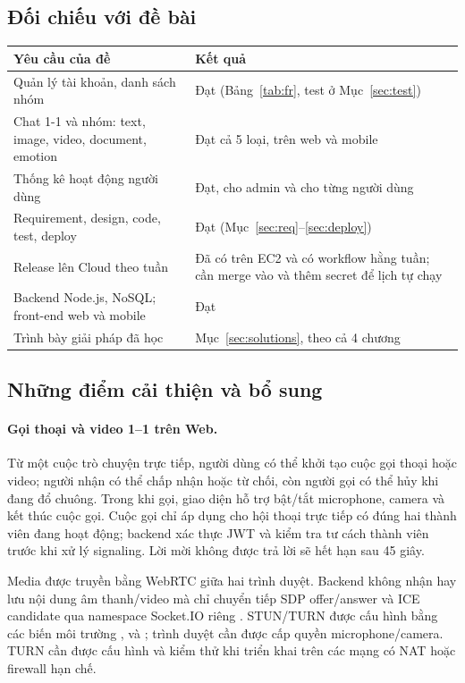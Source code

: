 \documentclass[11pt, a4paper]{article}
\begin{document}
\subsection{Đối chiếu với đề bài}
\begin{table}[H]
  \centering
  \small
  \begin{tabularx}{\linewidth}{P{6cm}Y}
    \toprule
    \textbf{Yêu cầu của đề} & \textbf{Kết quả} \\
    \midrule
    Quản lý tài khoản, danh sách nhóm & Đạt (Bảng~\ref{tab:fr}, test ở Mục~\ref{sec:test}) \\
    Chat 1-1 và nhóm: text, image, video, document, emotion & Đạt cả 5 loại, trên web và mobile \\
    Thống kê hoạt động người dùng & Đạt, cho admin và cho từng người dùng \\
    Requirement, design, code, test, deploy & Đạt (Mục~\ref{sec:req}--\ref{sec:deploy}) \\
    Release lên Cloud theo tuần & Đã có trên EC2 và có workflow hằng tuần; cần merge vào  và thêm secret để lịch tự chạy \\
    Backend Node.js, NoSQL; front-end web và mobile & Đạt \\
    Trình bày giải pháp đã học & Mục~\ref{sec:solutions}, theo cả 4 chương \\
    \bottomrule
  \end{tabularx}
\end{table}

\subsection{Những điểm cải thiện và bổ sung}
\label{subsec:improvements}

\paragraph{Gọi thoại và video 1--1 trên Web.}
Từ một cuộc trò chuyện trực tiếp, người dùng có thể khởi tạo cuộc gọi thoại hoặc video; người nhận có thể chấp nhận hoặc từ chối, còn người gọi có thể hủy khi đang đổ chuông. Trong khi gọi, giao diện hỗ trợ bật/tắt microphone, camera và kết thúc cuộc gọi. Cuộc gọi chỉ áp dụng cho hội thoại trực tiếp có đúng hai thành viên đang hoạt động; backend xác thực JWT và kiểm tra tư cách thành viên trước khi xử lý signaling. Lời mời không được trả lời sẽ hết hạn sau 45 giây.

Media được truyền bằng WebRTC giữa hai trình duyệt. Backend không nhận hay lưu nội dung âm thanh/video mà chỉ chuyển tiếp SDP offer/answer và ICE candidate qua namespace Socket.IO riêng . STUN/TURN được cấu hình bằng các biến môi trường ,  và ; trình duyệt cần được cấp quyền microphone/camera. TURN cần được cấu hình và kiểm thử khi triển khai trên các mạng có NAT hoặc firewall hạn chế.
\end{document}
